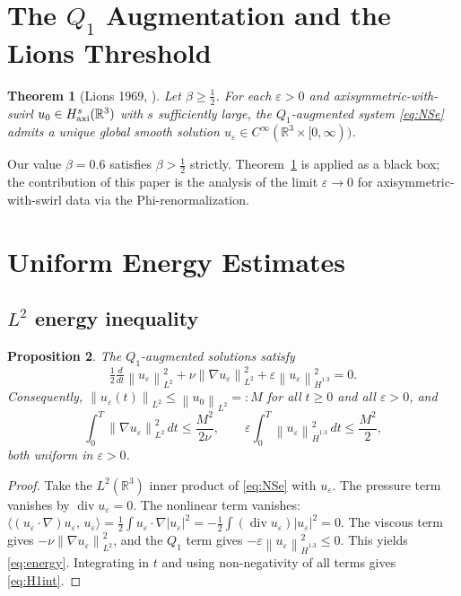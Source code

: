 \documentclass{article}
\newtheorem{theorem}{Theorem}[section]
\newtheorem{proposition}[theorem]{Proposition}
\theoremstyle{definition}
\theoremstyle{remark}
\newcommand{\R}{\mathbb{R}}
\newcommand{\e}{\varepsilon}
\newcommand{\half}{\tfrac{1}{2}}
\newcommand{\norm}[1]{\left\|#1\right\|}
\newcommand{\inner}[2]{\langle #1,\, #2\rangle}
\newcommand{\ddt}{\tfrac{d}{dt}}
\begin{document}
\section{The \texorpdfstring{$Q_1$}{Q1} Augmentation
  and the Lions Threshold}\label{sec:Q1}

\begin{theorem}[Lions 1969, \cite{Lions1969}]\label{thm:lions}
  Let $\beta \ge \tfrac{1}{2}$.  For each $\e > 0$ and
  axisymmetric-with-swirl $u_0\in H^s_{\rm axi}(\R^3)$ with $s$
  sufficiently large, the $Q_1$-augmented system \eqref{eq:NSe} admits a
  unique global smooth solution $u_\e \in C^\infty(\R^3\times[0,\infty))$.
\end{theorem}

Our value $\beta = 0.6$ satisfies $\beta > \tfrac{1}{2}$ strictly.
Theorem~\ref{thm:lions} is applied as a black box; the contribution of
this paper is the analysis of the limit $\e\to 0$ for axisymmetric-with-swirl
data via the Phi-renormalization.

\section{Uniform Energy Estimates}\label{sec:energy}

\subsection{\texorpdfstring{$L^2$}{L2} energy inequality}

\begin{proposition}\label{prop:L2}
  The $Q_1$-augmented solutions satisfy
  \begin{equation}\label{eq:energy}
    \half\ddt\norm{u_\e}_{L^2}^2
    + \nu\norm{\nabla u_\e}_{L^2}^2
    + \e\norm{u_\e}_{\dot H^{1.3}}^2 = 0.
  \end{equation}
  Consequently, $\norm{u_\e(t)}_{L^2} \le \norm{u_0}_{L^2} =: M$
  for all $t\ge 0$ and all $\e > 0$, and
  \begin{equation}\label{eq:H1int}
    \int_0^T\norm{\nabla u_\e}_{L^2}^2\,dt \le \frac{M^2}{2\nu},
    \qquad
    \e\int_0^T\norm{u_\e}_{\dot H^{1.3}}^2\,dt \le \frac{M^2}{2},
  \end{equation}
  both uniform in $\e > 0$.
\end{proposition}
\begin{proof}
  Take the $L^2(\R^3)$ inner product of \eqref{eq:NSe} with $u_\e$.
  The pressure term vanishes by $\operatorname{div}u_\e = 0$.  The
  nonlinear term vanishes:
  $\inner{(u_\e\cdot\nabla)u_\e}{u_\e} = \half\int u_\e\cdot\nabla|u_\e|^2
  = -\half\int(\operatorname{div}u_\e)|u_\e|^2 = 0$.
  The viscous term gives $-\nu\norm{\nabla u_\e}_{L^2}^2$, and the
  $Q_1$ term gives $-\e\norm{u_\e}_{\dot H^{1.3}}^2 \le 0$.
  This yields \eqref{eq:energy}.  Integrating in $t$ and using
  non-negativity of all terms gives \eqref{eq:H1int}.
\end{proof}
\end{document}
